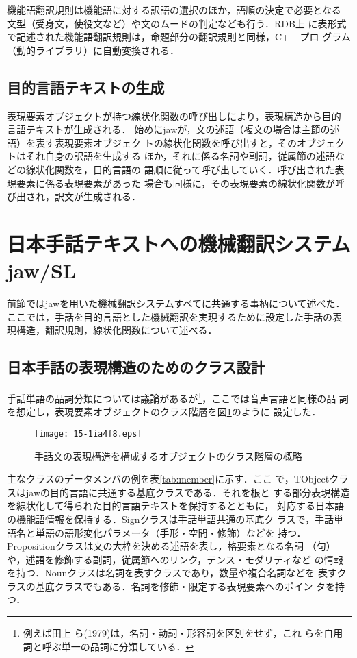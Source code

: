 \documentclass[japanese]{jnlp_1.4}
\begin{document}
機能語翻訳規則は機能語に対する訳語の選択のほか，語順の決定で必要となる
文型（受身文，使役文など）や文のムードの判定なども行う．RDB上
に表形式で記述された機能語翻訳規則は，命題部分の翻訳規則と同様，C++ プロ
グラム（動的ライブラリ）に自動変換される．


\subsection{目的言語テキストの生成}

表現要素オブジェクトが持つ線状化関数の呼び出しにより，表現構造から目的
言語テキストが生成される．
始めにjawが，文の述語（複文の場合は主節の述語）を表す表現要素オブジェク
トの線状化関数を呼び出すと，そのオブジェクトはそれ自身の訳語を生成する
ほか，それに係る名詞や副詞，従属節の述語などの線状化関数を，目的言語の
語順に従って呼び出していく．呼び出された表現要素に係る表現要素があった
場合も同様に，その表現要素の線状化関数が呼び出され，訳文が生成される．


\section{日本手話テキストへの機械翻訳システムjaw/SL}

前節ではjawを用いた機械翻訳システムすべてに共通する事柄について述べた．
ここでは，手話を目的言語とした機械翻訳を実現するために設定した手話の表
現構造，翻訳規則，線状化関数について述べる．



\subsection{日本手話の表現構造のためのクラス設計}

手話単語の品詞分類については議論があるが\footnote{例えば田上
  ら(1979)\nocite{Tanokami1979}は，名詞・動詞・形容詞を区別をせず，これ
  らを自用詞と呼ぶ単一の品詞に分類している．}，ここでは音声言語と同様の品
詞を想定し，表現要素オブジェクトのクラス階層を図\ref{fig:class}のように
設定した．

\begin{figure}[b]
  \centering
      \texttt{[image: 15-1ia4f8.eps]}
  \caption{手話文の表現構造を構成するオブジェクトのクラス階層の概略}
  \label{fig:class}
\end{figure}

主なクラスのデータメンバの例を表\ref{tab:member}に示す．ここ
で，TObjectクラスはjawの目的言語に共通する基底クラスである．それを根と
する部分表現構造を線状化して得られた目的言語テキストを保持するとともに，
対応する日本語の機能語情報を保持する．Signクラスは手話単語共通の基底ク
ラスで，手話単語名と単語の語形変化パラメータ（手形・空間・修飾）などを
持つ．Propositionクラスは文の大枠を決める述語を表し，格要素となる名詞
（句）や，述語を修飾する副詞，従属節へのリンク，テンス・モダリティなど
の情報を持つ．Nounクラスは名詞を表すクラスであり，数量や複合名詞などを
表すクラスの基底クラスでもある．名詞を修飾・限定する表現要素へのポイン
タを持つ．
\end{document}

